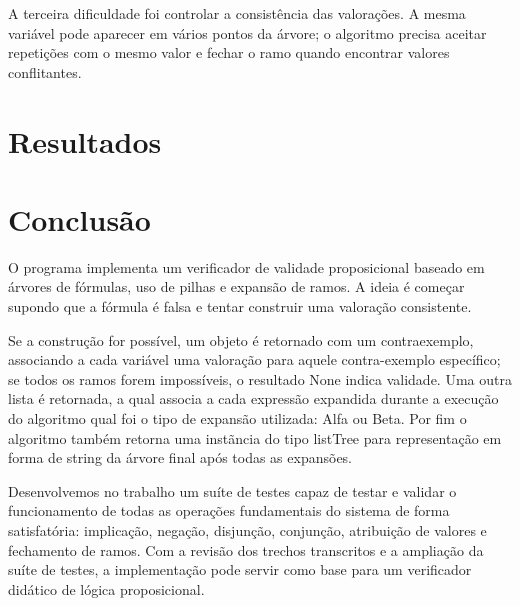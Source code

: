 \documentclass[a4paper]{article}
\begin{document}
A terceira dificuldade foi controlar a consistência das valorações. A mesma variável pode aparecer em vários pontos da árvore; o algoritmo precisa aceitar repetições com o mesmo valor e fechar o ramo quando encontrar valores conflitantes. 

\section{Resultados}


\section{Conclusão}
O programa implementa um verificador de validade proposicional baseado em árvores de fórmulas, uso de pilhas e expansão de ramos. A ideia é começar supondo que a fórmula é falsa e tentar construir uma valoração consistente.

Se a construção for possível, um objeto é retornado com um contraexemplo, associando a cada variável uma valoração para aquele contra-exemplo específico; se todos os ramos forem impossíveis, o resultado None indica validade. Uma outra lista é retornada, a qual associa a cada expressão expandida durante a execução do algoritmo qual foi o tipo de expansão utilizada: Alfa ou Beta. Por fim o algoritmo também retorna uma instãncia do tipo listTree para representação em forma de string da árvore final após todas as expansões.

Desenvolvemos no trabalho um suíte de testes capaz de testar e validar o funcionamento de todas as operações fundamentais do sistema de forma satisfatória: implicação, negação, disjunção, conjunção, atribuição de valores e fechamento de ramos. 
Com a revisão dos trechos transcritos e a ampliação da suíte de testes, a implementação pode servir como base para um verificador didático de lógica proposicional.
\end{document}
